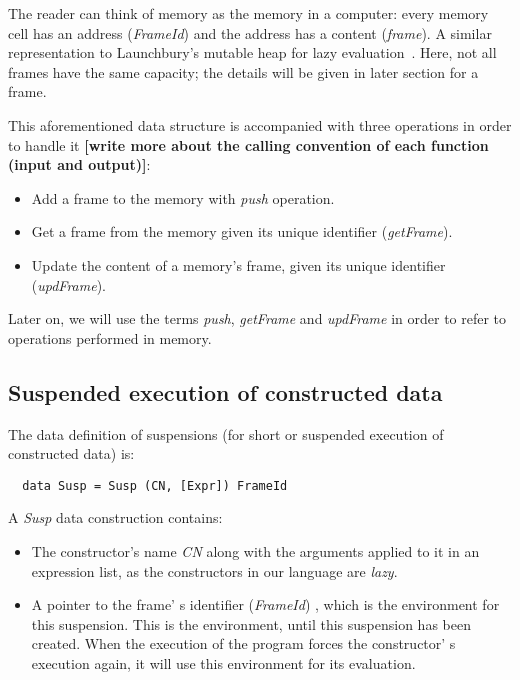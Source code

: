 \documentclass[diploma]{softlab-thesis}
\begin{document}
The reader can think of memory as the memory in a computer: every memory cell has an address (\textit{FrameId}) and 
the address has a content (\textit{frame}). A similar representation to Launchbury's mutable heap for 
lazy evaluation~\cite{La93}.
Here, not all frames have the same capacity; the details will be given in later section for a frame.
\newline
\par This aforementioned data structure is accompanied with three operations in order to handle it \textbf{[write 
more about the calling convention of each function (input and output)]}:
\begin{itemize}
  \item Add a frame to the memory with \textit{push} operation.
  \item Get a frame from the memory given its unique identifier (\textit{getFrame}).
  \item Update the content of a memory's frame, given its unique identifier (\textit{updFrame}).
\end{itemize}

Later on, we will use the terms \textit{push}, \textit{getFrame} and \textit{updFrame} in order to refer to 
operations performed in memory.

\subsection{Suspended execution of constructed data}

The data definition of suspensions (for short or suspended execution of constructed data) is:
\begin{verbatim}
  data Susp = Susp (CN, [Expr]) FrameId
\end{verbatim}

A \textit{Susp} data construction contains:
\begin{itemize}
  \item The constructor's name \textit{CN} along with the arguments applied to it in an expression list, 
  as the constructors in our language are \textit{lazy}.
  \item A pointer to the frame' s identifier (\textit{FrameId}) , which is the environment for this suspension.
  This is the environment, until this suspension has been created. When the execution of the program forces the 
  constructor' s execution again, it will use this environment for its evaluation.
\end{itemize}
\end{document}
